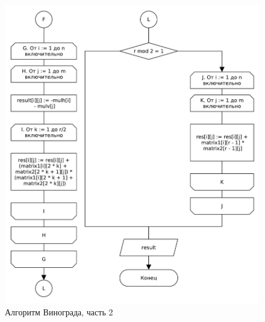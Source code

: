 \begin{figure}[H]
    \centering
    \includegraphics[scale=0.75]{pdf/winograd-part2.pdf}
    \caption{Алгоритм Винограда, часть 2}
\end{figure}

